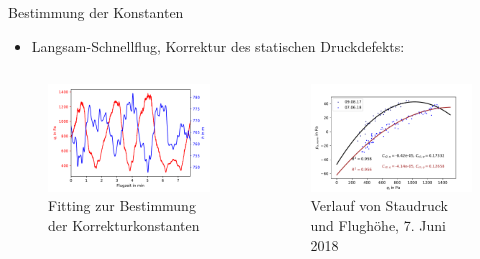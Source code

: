 \documentclass[ucs,9pt]{beamer}
\begin{document}
\begin{frame}{Bestimmung der Konstanten}
	\begin{itemize}
		\item Langsam-Schnellflug, Korrektur des statischen Druckdefekts:
	\end{itemize}
	\begin{columns}
		\begin{column}{0.48\textwidth}
			\begin{figure}
				\includegraphics[width=\textwidth]{./docmedia/acc_dec_pattern.pdf}
				\caption{Fitting zur Bestimmung der Korrekturkonstanten}
			\end{figure}
		\end{column}
		\begin{column}{0.48\textwidth}
			\begin{figure}
				\includegraphics[width=\textwidth]{./docmedia/static_defect_reg.pdf}
				\caption{Verlauf von Staudruck und Flughöhe, 7. Juni 2018}
			\end{figure}
		\end{column}
	\end{columns}
\end{frame}
\end{document}
